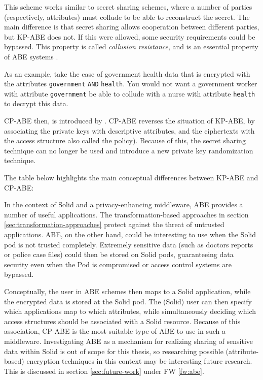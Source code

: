 

\noindent This scheme works similar to secret sharing schemes, where a number of parties (respectively, attributes) must collude to be able to reconstruct the secret. The main difference is that secret sharing allows cooperation between different parties, but \gls{KP-ABE} does not. If this were allowed, some security requirements could be bypassed. This property is called \textit{collusion resistance}, and is an essential property of \gls{ABE} systems \citep{cp-abe}. 

As an example, take the case of government health data that is encrypted with the attributes \texttt{government} \texttt{AND} \texttt{health}. You would not want a government worker with attribute \texttt{government} be able to collude with a nurse with attribute \texttt{health} to decrypt this data.

\acrlong{CP-ABE} then, is introduced by \citet{cp-abe}. \Gls{CP-ABE} reverses the situation of \gls{KP-ABE}, by associating the private keys with descriptive attributes, and the ciphertexts with the access structure also called the policy). Because of this, the secret sharing technique can no longer be used and \citeauthor{cp-abe} introduce a new private key randomization technique. 

The table below highlights the main conceptual differences between \gls{KP-ABE} and \gls{CP-ABE}:


\noindent In the context of Solid and a privacy-enhancing middleware, \gls{ABE} provides a number of useful applications. The transformation-based approaches in section \ref{sec:transformation-approaches} protect against the threat of untrusted applications. \Gls{ABE}, on the other hand, could be interesting to use when the Solid pod is not trusted completely. Extremely sensitive data (such as doctors reports or police case files) could then be stored on Solid pods, guaranteeing data security even when the Pod is compromised or access control systems are bypassed.

Conceptually, the user in \gls{ABE} schemes then maps to a Solid application, while the encrypted data is stored at the Solid pod. The (Solid) user can then specify which applications map to which attributes, while simultaneously deciding which access structures should be associated with a Solid resource. Because of this association, \gls{CP-ABE} is the most suitable type of \gls{ABE} to use in such a middleware. Investigating \gls{ABE} as a mechanism for realizing sharing of sensitive data within Solid is out of scope for this thesis, so researching possible (attribute-based) encryption techniques in this context may be interesting future research. This is discussed in section \ref{sec:future-work} under FW \ref{fw:abe}.
